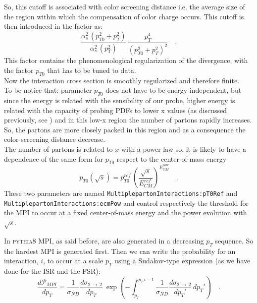 \noindent So, this cutoff is associated with color screening distance i.e. the average size of the region within which the  compensation of color charge occurs.
This cutoff is then introduced in the factor as:
\begin{equation}
	\frac{\alpha_s^2\,(p_{T0}^2+p_{T}^2)}{\alpha_s^2\,(p_T^2)}\,\frac{p_T^4}{(p_{T0}^2+p_T^2)^2}\quad .
\end{equation}
This factor contains the phenomenological regularization of the divergence, with the factor $p_{T0}$ that has to be tuned to data. 
\\
Now the interaction cross section is smoothly regularized and therefore finite.
\\
To be notice that: parameter $p_{T0}$ does not have to be energy-independent, but since the energy is related with the sensibility of our probe, higher energy is related with the capacity of probing PDFs to lower x values (as discussed previously, see ) and in this low-x region the number of partons rapidly increases. So, the partons are more closely packed in this region and as a consequence the color-screening distance decrease.
\\
The number of partons is related to $x$ with a power law so, it is likely to have a dependence of the same form for $p_{T0}$ respect to the center-of-mass energy
\begin{equation}
	p_{T0}(\sqrt{s})=p_{T0}^{ref} \,\left( \frac{\sqrt{s}}{E_{CM}^{ref}} \right)^{E_{CM}^{pow}}\quad .
\end{equation}
These two parameters are named \texttt{MultiplepartonInteractions:}\-\texttt{pT0Ref} and \texttt{Mul}\-\texttt{tiple}\-\texttt{partonInteractions:}\-\texttt{ecmPow} and control respectively the threshold for the MPI to occur at a fixed center-of-mass energy and the power evolution with $\sqrt{s}$. 


In \textsc{pythia}8 MPI, as said before, are also generated in a decreasing $p_T$ sequence. So the hardest MPI is generated first. Then we can write the probability for an interaction, $i$, to occur at a scale $p_T$ using a Sudakov-type expression (as we have done for the ISR and the FSR):
\begin{equation}
	\frac{d\mathcal{P}_{MPI}}{dp_T}=\frac{1}{\sigma_{ND}}\frac{d\sigma_{2\,\rightarrow\,2}}{dp_T}\ \exp\left( -\displaystyle\int_{p_T}^{p_T\,i-1} \frac{1}{\sigma_{ND}}\frac{d\sigma_{2\,\rightarrow\,2}}{dp_T'}\,dp_T' \right)\quad .
\end{equation}


